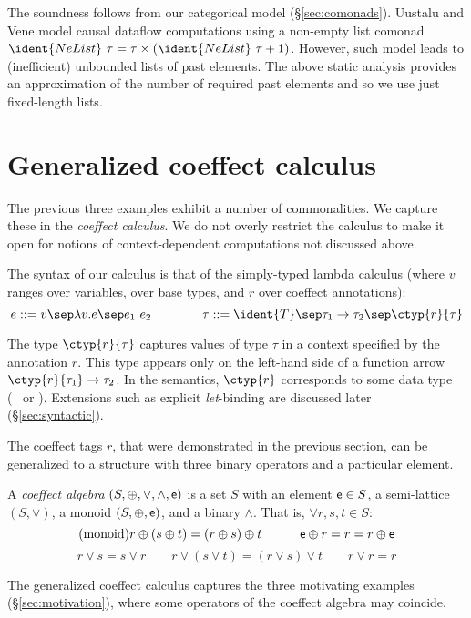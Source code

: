 The soundness follows from our categorical model (\S\ref{sec:comonads}). Uustalu and Vene
\cite{comonads-notions} model causal dataflow computations using a non-empty list comonad 
$\ident{NeList}~\tau = \tau \times (\ident{NeList}~\tau + 1)$. However, such model leads to
(inefficient) unbounded lists of past elements. The above static analysis provides an
approximation of the number of required past elements and so we use just fixed-length lists.


\section{Generalized coeffect calculus}
\label{sec:calculus}

The previous three examples exhibit a number of commonalities. We capture these in 
the \emph{coeffect calculus}. We do not overly restrict the calculus to make
it open for notions of context-dependent computations not discussed above.

The syntax of our calculus is that of the simply-typed lambda calculus
(where $v$ ranges over variables,  over base types, and $r$ over coeffect annotations):
%
\begin{equation*}
e ::= v \sep \lambda v.e \sep e_1~e_2
\quad\quad\quad\quad
\tau ::= \ident{T} \sep \tau_1 \rightarrow \tau_2 \sep \ctyp{r}{\tau}
\end{equation*}

The type $\ctyp{r}{\tau}$ captures values of type $\tau$ in a context
specified by the annotation  $r$. This type appears only on the
left-hand side of a function arrow $\ctyp{r}{\tau_1} \rightarrow \tau_2$. 
In the semantics, $\ctyp{r}$ corresponds to some data type
(\eg{}~ or ). Extensions
such as explicit \emph{let}-binding are discussed later
(\S\ref{sec:syntactic}).

The coeffect tags $r$, that were demonstrated in the previous section, can be generalized to a 
structure with three binary operators and a particular element. 

\begin{definition}
A \emph{coeffect algebra} $(S, \oplus, \vee, \wedge, \mathsf{e})$ is a set $S$ with
an element $\mathsf{e} \in S$, a semi-lattice $(S, \vee)$, a monoid $(S, \oplus, \mathsf{e})$,
and a binary $\wedge$. That is, $\forall r,s,t\in S$:
\begin{equation}
\tag{monoid}
   r \oplus (s \oplus t) = (r \oplus s) \oplus t 
\quad\quad\quad
   \mathsf{e} \oplus r = r = r \oplus \mathsf{e}  \quad\quad
\end{equation}
\vspace{-1.5em}
\begin{equation}
\tag{semi-lattice}
   r \vee s = s \vee r 
\quad\quad
   r \vee (s \vee t) = (r \vee s) \vee t
\quad\quad
   r \vee r = r
\end{equation}
\end{definition}
%
The generalized coeffect calculus captures the three motivating examples (\S\ref{sec:motivation}),
where some operators of the coeffect algebra may coincide. 

